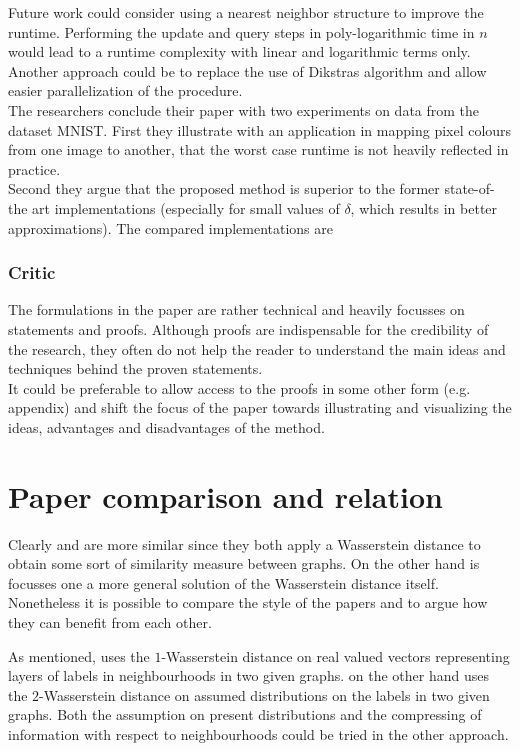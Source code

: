 \documentclass[twoside]{scrartcl}
\begin{document}
Future work could consider using a nearest neighbor structure to improve the runtime. Performing the update and query steps in poly-logarithmic time in $n$ would lead to a runtime complexity with linear and logarithmic terms only. \\
Another approach could be to replace the use of Dikstras algorithm and allow easier parallelization of the procedure.\\

The researchers conclude their paper with two experiments on data from the dataset MNIST. First they illustrate with an application in mapping pixel colours from one image to another, that the worst case runtime is not heavily reflected in practice.\\
Second they argue that the proposed method is superior to the former state-of-the art implementations (especially for small values of $\delta$, which results in better approximations). The compared implementations are %

\subsubsection{Critic}
The formulations in the paper are rather technical and heavily focusses on statements and proofs. Although proofs are indispensable for the credibility of the research, they often do not help the reader to understand the main ideas and techniques behind the proven statements.\\
It could be preferable to allow access to the proofs in some other form (e.g. appendix) and shift the focus of the paper towards illustrating and visualizing the ideas, advantages and disadvantages of the method.
\section{Paper comparison and relation}
Clearly \cite{A} and \cite{B} are more similar since they both apply a Wasserstein distance to obtain some sort of similarity measure between graphs. On the other hand \cite{C} is focusses one a more general solution of the Wasserstein distance itself.\\

Nonetheless it is possible to compare the style of the papers and to argue how they can benefit from each other.

As mentioned, \cite{A} uses the $1$-Wasserstein distance on real valued vectors representing layers of labels in neighbourhoods in two given graphs. \cite{B} on the other hand uses the $2$-Wasserstein distance on assumed distributions on the labels in two given graphs. Both the assumption on present distributions and the compressing of information with respect to neighbourhoods could be tried in the other approach.\\
\end{document}
